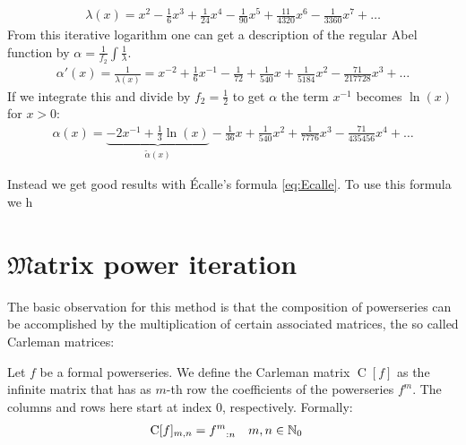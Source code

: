 \documentclass{article}
\numberwithin{equation}{section}
\begin{document}
\begin{align*}
\lambda(x)=x^2-\frac{1}{6}x^3+\frac{1}{24}x^4-\frac{1}{90}x^5+\frac{11}{4320}x^6-\frac{1}{3360}x^7+\dots
\end{align*}
From this iterative logarithm one can get a description of the regular
Abel function by $\alpha = \frac{1}{f_2}\int \frac{1}{\lambda}$.
\begin{align*}
\alpha'(x)=\frac{1}{\lambda(x)}=x^{-2}+
\frac{1}{6}x^{-1}-\frac{1}{72}+\frac{1}{540}x+\frac{1}{5184}x^2-\frac{71}{217728}x^3+\dots
\end{align*}
If we integrate this and divide by $f_2=\frac{1}{2}$ to get $\alpha$ the term $x^{-1}$ becomes
$\ln(x)$ for $x>0$:
\begin{align}
\alpha(x)=\underbrace{-2x^{-1}+\frac{1}{3}\ln(x)}_{\tilde{\alpha}(x)}
-\frac{1}{36}x+ \frac{1}{540}x^2+
\frac{1}{7776}x^3 -\frac{71}{435456}x^4+
\dots
\end{align}

Instead we
get good results with Écalle's formula \eqref{eq:Ecalle}.
To use this formula we h
  

\section{${\mathfrak{M}}$atrix power iteration}
\label{sec:Matrix power}
The basic observation for this method is that the composition of
powerseries can be accomplished by the multiplication of certain
associated matrices, the so called Carleman matrices:

\newcommand{\carl}[1]{\operatorname{C}[#1]}
\newcommand{\Carl}[1]{\operatorname{C}\left[#1\right]}
\newcommand{\carlt}[2]{\operatorname{C_#2}[#1]}
\newcommand{\Carlt}[2]{\operatorname{C_#2}\left[#1\right]}
\begin{definition}
  Let $f$ be a formal powerseries. We define the Carleman matrix
  $\carl{f}$ as the infinite matrix that has as $m$-th row the
  coefficients of the powerseries $f^m$. The columns and rows here
  start at index 0, respectively. Formally:
  \begin{align}
    \carl{f}_{m,n} &= {f^m}_{:n}&& m,n\in \NZ
  \end{align}
\end{definition}
\end{document}
